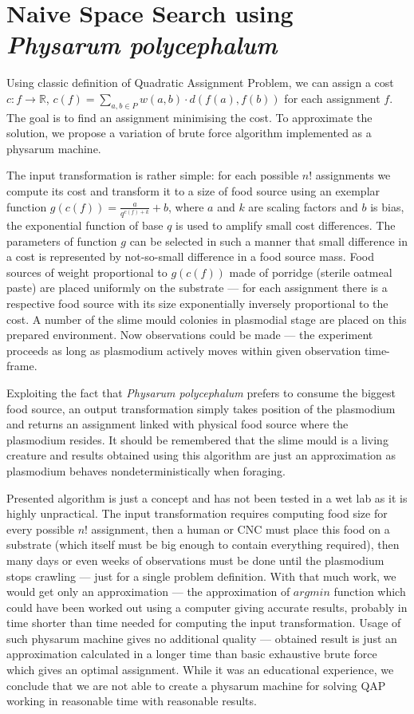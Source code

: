 \section{Naive Space Search using \textit{Physarum polycephalum}}
\label{section:algorithm_naive}

Using classic definition of Quadratic Assignment Problem, we can assign a cost $c : f \rightarrow \mathbb{R}$, $c(f) = \sum_{a,b\in P}w(a,b)\cdot d(f(a), f(b))$ for each assignment $f$. The goal is to find an assignment minimising the cost. To approximate the solution, we propose a variation of brute force algorithm implemented as a physarum machine.

The input transformation is rather simple: for each possible $n!$ assignments we compute its cost and transform it to a size of food source using an exemplar function $g(c(f)) = \frac{a}{q^{c(f)+k}}+b$, where $a$ and $k$ are scaling factors and $b$ is bias, the exponential function of base $q$ is used to amplify small cost differences. The parameters of function $g$ can be selected in such a manner that small difference in a cost is represented by not-so-small difference in a food source mass. Food sources of weight proportional to $g(c(f))$ made of porridge (sterile oatmeal paste) are placed uniformly on the substrate --- for each assignment there is a respective food source with its size exponentially inversely proportional to the cost. A number of the slime mould colonies in plasmodial stage are placed on this prepared environment. Now observations could be made --- the experiment proceeds as long as plasmodium actively moves within given observation time-frame. 

Exploiting the fact that \textit{Physarum polycephalum} prefers to consume the biggest food source, an output transformation simply takes position of the plasmodium and returns an assignment linked with physical food source where the plasmodium resides. It should be remembered that the slime mould is a living creature and results obtained using this algorithm are just an approximation as plasmodium behaves nondeterministically when foraging.

Presented algorithm is just a concept and has not been tested in a wet lab as it is highly unpractical. The input transformation requires computing food size for every possible $n!$ assignment, then a human or CNC must place this food on a substrate (which itself must be big enough to contain everything required), then many days or even weeks of observations must be done until the plasmodium stops crawling --- just for a single problem definition. With that much work, we would get only an approximation --- the approximation of $argmin$ function which could have been worked out using a computer giving accurate results, probably in time shorter than time needed for computing the input transformation. Usage of such physarum machine gives no additional quality --- obtained result is just an approximation calculated in a longer time than basic exhaustive brute force which gives an optimal assignment. While it was an educational experience, we conclude that we are not able to create a physarum machine for solving QAP working in reasonable time with reasonable results.
